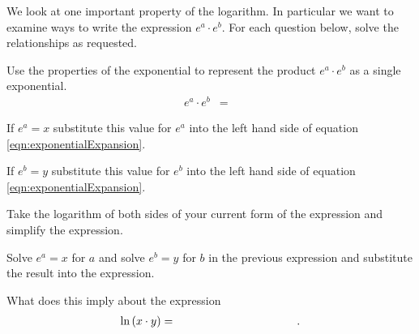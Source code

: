 \begin{problem}
\item We look at one important property of the logarithm. In
  particular we want to examine ways to write the expression
  $e^a\cdot e^b$. For each question below, solve the relationships as
  requested.
  \begin{subproblem}
  \item Use the properties of the exponential to represent the product
    $e^a\cdot e^b$ as a single exponential.
    \label{subprob:exponentialExpansion}
    \begin{eqnarray}
      \label{eqn:exponentialExpansion}
      e^a \cdot e^b & = & 
    \end{eqnarray}
  \item If $e^a=x$ substitute this value for $e^a$ into the left hand
    side of equation \ref{eqn:exponentialExpansion}.
    \vspace{4em}
  \item If $e^b=y$ substitute this value for $e^b$ into the left hand
    side of equation \ref{eqn:exponentialExpansion}.
    \vspace{4em}
  \item Take the logarithm of both sides of your current form of the
    expression and simplify the expression.
    \vfill
  \item Solve $e^a=x$ for $a$ and solve $e^b=y$ for $b$ in the
    previous expression and substitute the result into the expression.
    \vfill
  \item What does this imply about the expression 
    \begin{eqnarray*}
      \ln\lp x \cdot y \rp & = & \hspace{10em}.
    \end{eqnarray*}
  \end{subproblem}

  \clearpage


\end{problem}

